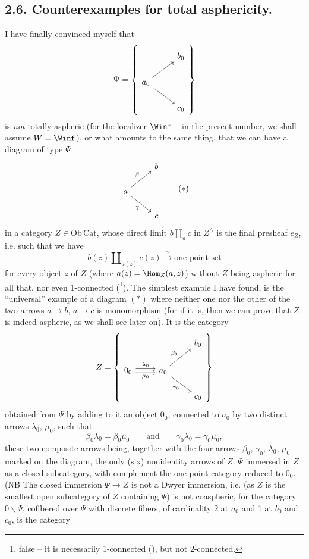 \subsection*{2.6. Counterexamples for total asphericity.}

I have finally convinced myself that
\[
\Psi = \left\{
\begin{tikzcd}
& b_0 \\
a_0 \arrow[ur] \arrow[dr] & \\
& c_0
\end{tikzcd}
\right\}
\]
is \textit{not} totally aspheric (for the localizer $\Winf$ -- in the present number, we shall assume $W = \Winf$), or what amounts to the same thing, that we can have a diagram of type $\Psi$
\[
\begin{tikzcd}
& b \\
a \arrow[ur, "\beta"] \arrow[dr, "\gamma"'] & \\
& c
\end{tikzcd}
\tag*{$(*)$}
\]
in a category $Z \in \mathrm{Ob}\,\mathrm{Cat}$, whose direct limit $b \amalg_a c$ in $Z^{\wedge}$ is the final presheaf $e_Z$, i.e. such that we have
\[ b(z) \amalg_{a(z)} c(z) \xrightarrow{\ \sim\ } \text{one-point set} \]
for every object $z$ of $Z$ (where $a(z) = \Hom_Z(a,z)$) without $Z$ being aspheric for all that, nor even 1-connected (\footnote[5]{false -- it is necessarily 1-connected (\footnotemark[6]), but not 2-connected.}). The simplest example I have found, is the ``universal'' example of a diagram $(*)$ where neither one nor the other of the two arrows $a \longrightarrow b$, $a \longrightarrow c$ is monomorphism (for if it is, then we can prove that $Z$ is indeed aspheric, as we shall see later on). It is the category
\[
Z = \left\{
\begin{tikzcd}
& & b_0 \\
0_0 \arrow[r, shift left, "\lambda_0"] \arrow[r, shift right, "\mu_0"'] & a_0 \arrow[ur, "\beta_0"] \arrow[dr, "\gamma_0"'] & \\
& & c_0
\end{tikzcd}
\right\}
\]
obtained from $\Psi$ by adding to it an object $0_0$, connected to $a_0$ by two distinct arrows $\lambda_0$, $\mu_0$, such that
\[ \beta_0\lambda_0 = \beta_0\mu_0 \qquad \text{and} \qquad \gamma_0\lambda_0 = \gamma_0\mu_0, \]
these two composite arrows being, together with the four arrows $\beta_0$, $\gamma_0$, $\lambda_0$, $\mu_0$ marked on the diagram, the only (six) nonidentity arrows of $Z$. $\Psi$ immersed in $Z$ as a closed subcategory, with complement the one-point category reduced to $0_0$. (NB The closed immersion $\Psi \longrightarrow Z$ is not a Dwyer immersion, i.e. (as $Z$ is the smallest open subcategory of $Z$ containing $\Psi$) is not coaspheric, for the category $0\backslash\Psi$, cofibered over $\Psi$ with discrete fibers, of cardinality 2 at $a_0$ and 1 at $b_0$ and $c_0$, is the category
